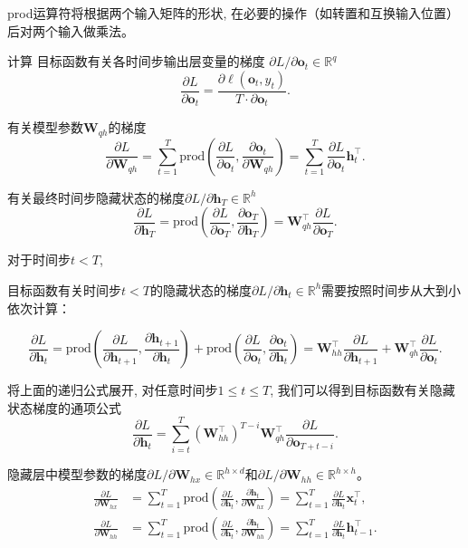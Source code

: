 \documentclass[a4paper]{article}
\begin{document}
prod运算符将根据两个输⼊矩阵的形状, 在必要的操作（如转置和互换输⼊位置）后对两个输⼊做乘法。


计算
目标函数有关各时间步输出层变量的梯度 $\partial L/\partial \boldsymbol{o}_t \in \mathbb{R}^q$
$$\frac{\partial L}{\partial \boldsymbol{o}_t} =  \frac{\partial \ell (\boldsymbol{o}_t,  y_t)}{T \cdot \partial \boldsymbol{o}_t}.$$

有关模型参数$\boldsymbol{W}_{qh}$的梯度
$$
\frac{\partial L}{\partial \boldsymbol{W}_{qh}} 
= \sum_{t=1}^T \text{prod}\left(\frac{\partial L}{\partial \boldsymbol{o}_t},  \frac{\partial \boldsymbol{o}_t}{\partial \boldsymbol{W}_{qh}}\right) 
= \sum_{t=1}^T \frac{\partial L}{\partial \boldsymbol{o}_t} \boldsymbol{h}_t^\top.
$$
 
有关最终时间步隐藏状态的梯度$\partial L/\partial \boldsymbol{h}_T \in \mathbb{R}^h$
$$
\frac{\partial L}{\partial \boldsymbol{h}_T} = \text{prod}\left(\frac{\partial L}{\partial \boldsymbol{o}_T},  \frac{\partial \boldsymbol{o}_T}{\partial \boldsymbol{h}_T} \right) = \boldsymbol{W}_{qh}^\top \frac{\partial L}{\partial \boldsymbol{o}_T}.
$$


对于时间步$t < T$, 

目标函数有关时间步$t < T$的隐藏状态的梯度$\partial L/\partial \boldsymbol{h}_t \in \mathbb{R}^h$需要按照时间步从大到小依次计算：

$$
\frac{\partial L}{\partial \boldsymbol{h}_t}
= \text{prod}\left(\frac{\partial L}{\partial \boldsymbol{h}_{t+1}},  \frac{\partial \boldsymbol{h}_{t+1}}{\partial \boldsymbol{h}_t} \right)
+ \text{prod}\left(\frac{\partial L}{\partial \boldsymbol{o}_t},  \frac{\partial \boldsymbol{o}_t}{\partial \boldsymbol{h}_t} \right)
= \boldsymbol{W}_{hh}^\top \frac{\partial L}{\partial \boldsymbol{h}_{t+1}} + \boldsymbol{W}_{qh}^\top \frac{\partial L}{\partial \boldsymbol{o}_t}.
$$

将上面的递归公式展开, 对任意时间步$1 \leq t \leq T$, 我们可以得到目标函数有关隐藏状态梯度的通项公式
$$
\frac{\partial L}{\partial \boldsymbol{h}_t} 
= \sum_{i=t}^T {\left(\boldsymbol{W}_{hh}^\top\right)}^{T-i} \boldsymbol{W}_{qh}^\top \frac{\partial L}{\partial \boldsymbol{o}_{T+t-i}}.
$$
 
隐藏层中模型参数的梯度$\partial L / \partial \boldsymbol{W}_{hx} \in \mathbb{R}^{h \times d}$和$\partial L / \partial \boldsymbol{W}_{hh} \in \mathbb{R}^{h \times h}$。
$$
\begin{aligned}
\frac{\partial L}{\partial \boldsymbol{W}_{hx}} 
&= \sum_{t=1}^T \text{prod}\left(\frac{\partial L}{\partial \boldsymbol{h}_t},  \frac{\partial \boldsymbol{h}_t}{\partial \boldsymbol{W}_{hx}}\right) 
= \sum_{t=1}^T \frac{\partial L}{\partial \boldsymbol{h}_t} \boldsymbol{x}_t^\top, \\
\frac{\partial L}{\partial \boldsymbol{W}_{hh}} 
&= \sum_{t=1}^T \text{prod}\left(\frac{\partial L}{\partial \boldsymbol{h}_t},  \frac{\partial \boldsymbol{h}_t}{\partial \boldsymbol{W}_{hh}}\right) 
= \sum_{t=1}^T \frac{\partial L}{\partial \boldsymbol{h}_t} \boldsymbol{h}_{t-1}^\top.
\end{aligned}
$$
\end{document}
